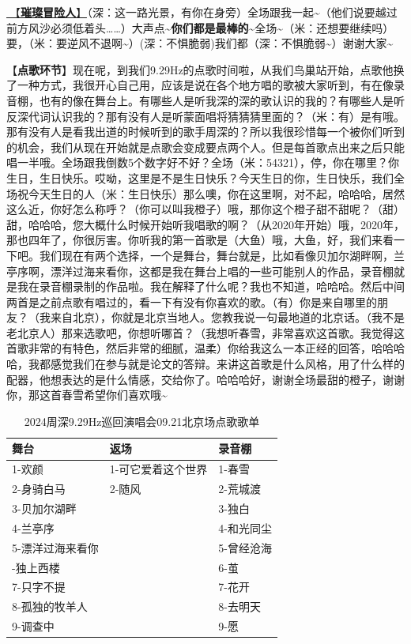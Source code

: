 \documentclass[]{ctexbook}
\begin{document}
\hyperref[adventurers]{🎵【\textbf{璀璨冒险人}】}（深：这一路光景，有你在身旁）全场跟我一起\textasciitilde（他们说要越过前方风沙必须低着头\ldots\ldots）大声点\textasciitilde{}\textbf{你们都是最棒的\textasciitilde{}}全场\textasciitilde（米：还想要继续吗）要，（米：要逆风不退啊\textasciitilde）(深：不惧脆弱)我们都（深：不惧脆弱\textasciitilde）谢谢大家\textasciitilde{}

【\textbf{点歌环节}】现在呢，到我们9.29Hz的点歌时间啦，从我们鸟巢站开始，点歌他换了一种方式，我很开心自己用，应该是说在各个地方唱的歌被大家听到，有在像录音棚，也有的像在舞台上。有哪些人是听我深的深的歌认识的我的？有哪些人是听反深代词认识我的？那有没有人是听蒙面唱将猜猜猜里面的？（米：有）是有哦。那有没有人是看我出道的时候听到的歌手周深的？所以我很珍惜每一个被你们听到的机会，我们从现在开始就是点歌会变成要点两个人。但是每首歌点出来之后只能唱一半哦。全场跟我倒数5个数字好不好？全场（米：54321），停，你在哪里？你生日，生日快乐。哎呦，这里是不是生日快乐？今天生日的你，生日快乐，我们全场祝今天生日的人（米：生日快乐）那么噢，你在这里啊，对不起，哈哈哈，居然这么近，你好怎么称呼？（你可以叫我橙子）哦，那你这个橙子甜不甜呢？（甜）甜，哈哈哈，您大概什么时候开始听我唱歌的啊？（从2020年开始）哦，2020年，那也四年了，你很厉害。你听我的第一首歌是（大鱼）哦，大鱼，好，我们来看一下吧。我们现在有两个选择，一个是舞台，舞台就是，比如看像贝加尔湖畔啊，兰亭序啊，漂洋过海来看你，这都是我在舞台上唱的一些可能别人的作品，录音棚就是我在录音棚录制的作品啦。我在解释了什么呢？我也不知道，哈哈哈。然后中间两首是之前点歌有唱过的，看一下有没有你喜欢的歌。（有）你是来自哪里的朋友？（我来自北京），你就是北京当地人。您教我说一句最地道的北京话。（我不是老北京人）那来选歌吧，你想听哪首？（我想听春雪，非常喜欢这首歌。我觉得这首歌非常的有特色，然后非常的细腻，温柔）你给我这么一本正经的回答，哈哈哈哈，我都感觉我们在参与就是论文的答辩。来讲这首歌是什么风格，用了什么样的配器，他想表达的是什么情感，交给你了。哈哈哈好，谢谢全场最甜的橙子，谢谢你，那这首春雪希望你们喜欢哦\textasciitilde{}

\begin{table}

\caption{\label{tab:unnamed-chunk-101}2024周深9.29Hz巡回演唱会09.21北京场点歌歌单}
\centering
\begin{tabular}[t]{lll}
\toprule
舞台 & 返场 & 录音棚\\
\midrule
1-欢颜 & 1-可它爱着这个世界 & 1-春雪\\
2-身骑白马 & 2-随风 & 2-荒城渡\\
3-贝加尔湖畔 &  & 3-独白\\
4-兰亭序 &  & 4-和光同尘\\
5-漂洋过海来看你 &  & 5-曾经沧海\\
\addlinespace
6-独上西楼 &  & 6-茧\\
7-只字不提 &  & 7-花开\\
8-孤独的牧羊人 &  & 8-去明天\\
9-调查中 &  & 9-愿\\
\bottomrule
\end{tabular}
\end{table}
\end{document}
